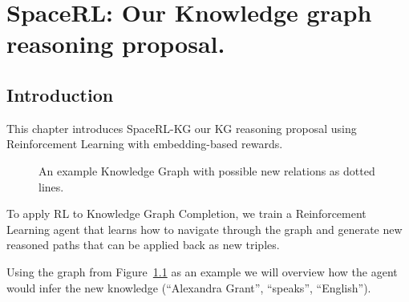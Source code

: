\chapter{SpaceRL: Our Knowledge graph reasoning proposal.}\label{chap:SpaceRL}




\section{Introduction}\label{sec:spacerl-intro}
This chapter introduces SpaceRL-KG our KG reasoning proposal using Reinforcement Learning with embedding-based rewards.

\begin{figure}[htp]
    \centering
    
    \caption{An example Knowledge Graph with possible new relations as dotted lines.}
    \label{fig:kg-example}
\end{figure}

To apply RL to Knowledge Graph Completion, we train a Reinforcement Learning agent that learns how to navigate through the graph and generate new reasoned paths that can be applied back as new triples.

Using the graph from Figure~\ref{fig:kg-example} as an example we will overview how the agent would infer the new knowledge (``Alexandra Grant'', ``speaks'', ``English'').

